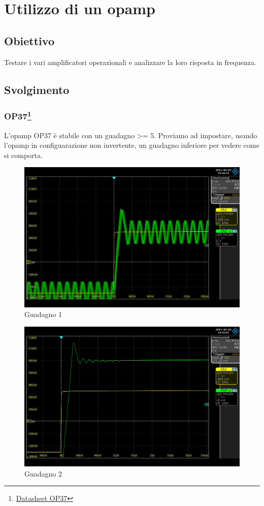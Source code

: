 \chapter{Utilizzo di un opamp}

\section*{Obiettivo}

Testare i vari amplificatori operazionali e analizzare la loro risposta in frequenza.
\section*{Svolgimento}
\subsection*{OP37\footnote{\href{https://www.analog.com/media/en/technical-documentation/data-sheets/OP37.pdf}{Datasheet OP37}}}
L'opamp OP37 è stabile con un guadagno >= 5. 
Proviamo ad impostare, usando l'opamp in configuarazione non invertente, un guadagno inferiore per vedere come si comporta.

\begin{figure}[H]
\centering
\includegraphics[width=\textwidth]{assets/exp8/Guadagno_1.png}
\caption{Guadagno 1}
\end{figure}

\begin{figure}[H]
\centering
\includegraphics[width=\textwidth]{assets/exp8/Guadagno_2.png}
\caption{Guadagno 2}
\end{figure}

